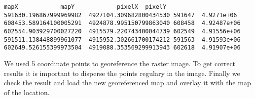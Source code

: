 \begin{verbatim}
mapX    		mapY    		pixelX  pixelY
591630.196867999969982  4927104.309682800434530 591647  4.9271e+06
608453.589164100005291  4924878.995150799863040 608458  4.92487e+06
602554.903929700027220  4915579.220743400044739 602549  4.91556e+06
591511.138448899961077  4915952.302661700174212 591563  4.91593e+06
602649.526155399973504  4919088.353569299913943 602618  4.91907e+06
\end{verbatim} 

We used 5 coordinate points to georeference the raster image.
To get correct results it is important to disperse the points regulary in the image.
Finally we check the result and load the new georeferenced map  and overlay it with the map  of the  location.

